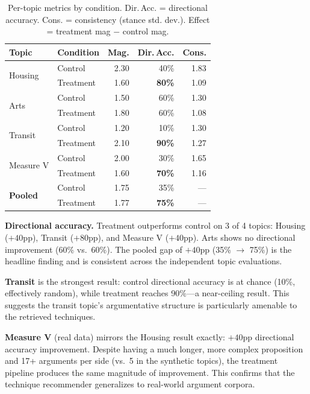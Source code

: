 \documentclass[sigconf]{acmart}
\begin{document}
\begin{table}[h]
\centering
\caption{Per-topic metrics by condition. Dir.\,Acc. = directional accuracy.
Cons. = consistency (stance std. dev.). Effect = treatment mag $-$ control mag.}
\label{tab:results}
\begin{tabular}{llrrr}
\toprule
Topic & Condition & Mag. & Dir.\,Acc. & Cons. \\
\midrule
\multirow{2}{*}{Housing}
  & Control   & 2.30 & 40\% & 1.83 \\
  & Treatment & 1.60 & \textbf{80\%} & 1.09 \\
\midrule
\multirow{2}{*}{Arts}
  & Control   & 1.50 & 60\% & 1.30 \\
  & Treatment & 1.80 & 60\% & 1.08 \\
\midrule
\multirow{2}{*}{Transit}
  & Control   & 1.20 & 10\% & 1.30 \\
  & Treatment & 2.10 & \textbf{90\%} & 1.27 \\
\midrule
\multirow{2}{*}{Measure V}
  & Control   & 2.00 & 30\% & 1.65 \\
  & Treatment & 1.60 & \textbf{70\%} & 1.16 \\
\midrule
\multirow{2}{*}{\textbf{Pooled}}
  & Control   & 1.75 & 35\% & --- \\
  & Treatment & 1.77 & \textbf{75\%} & --- \\
\bottomrule
\end{tabular}
\end{table}

\textbf{Directional accuracy.} Treatment outperforms control on 3 of 4 topics:
Housing ($+40$pp), Transit ($+80$pp), and Measure V ($+40$pp). Arts shows no
directional improvement (60\% vs.\ 60\%). The pooled gap of $+40$pp
(35\% $\to$ 75\%) is the headline finding and is consistent across the
independent topic evaluations.

\textbf{Transit} is the strongest result: control directional accuracy is at
chance (10\%, effectively random), while treatment reaches 90\%---a near-ceiling
result. This suggests the transit topic's argumentative structure is
particularly amenable to the retrieved techniques.

\textbf{Measure V} (real data) mirrors the Housing result exactly: $+40$pp
directional accuracy improvement. Despite having a much longer, more complex
proposition and 17+ arguments per side (vs.\ 5 in the synthetic topics), the
treatment pipeline produces the same magnitude of improvement. This confirms
that the technique recommender generalizes to real-world argument corpora.
\end{document}
